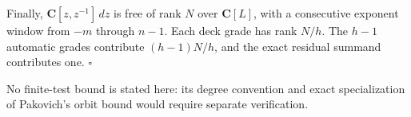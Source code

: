 \documentclass[
  11pt,
  a4paper,
]{amsart}
\begin{document}
Finally, \(\mathbf C[z,z^{-1}]\,dz\) is free of rank \(N\) over
\(\mathbf C[L]\), with a consecutive exponent window from \(-m\) through
\(n-1\). Each deck grade has rank \(N/h\). The \(h-1\) automatic grades
contribute \((h-1)N/h\), and the exact residual summand contributes one.
\(\square\)

No finite-test bound is stated here: its degree convention and exact
specialization of Pakovich's orbit bound would require separate
verification.
\end{document}
